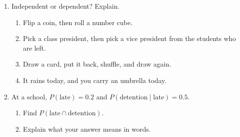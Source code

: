 \documentclass[11pt]{article}
\begin{document}
\begin{enumerate}
\begin{enumerate}[itemsep=1em]
\end{enumerate}

\newpage
\item Independent or dependent? Explain.
\begin{enumerate}[itemsep=2em]
  \item Flip a coin, then roll a number cube.

  \item Pick a class president, then pick a vice president from the students who are left.

  \item Draw a card, put it back, shuffle, and draw again.

  \item It rains today, and you carry an umbrella today.

\end{enumerate}
\work{1.5em}

\item At a school, $P(\text{late}) = 0.2$ and $P(\text{detention} \mid \text{late}) = 0.5$.
\begin{enumerate}[itemsep=1em]
  \item Find $P(\text{late} \cap \text{detention})$. 
  \item Explain what your answer means in words.

\end{enumerate}

\end{enumerate}
\end{document}
